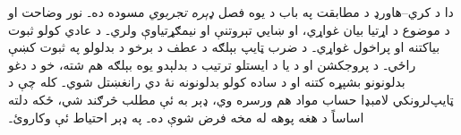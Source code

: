 \documentclass[../../../include/open-logic-chapter]{subfiles}
\begin{document}

\begin{editorial}
  دا د کري--هاورډ د مطابقت په باب د يوه فصل
  \emph{ډېره تجربوي} مسوده ده۔ نور وضاحت او د
  موضوع د اړتيا بيان غواړي، او ښايي تېروتنې او
  نيمګړتياوې ولري۔ د عادي کولو ثبوت بياکتنه او
  پراخول غواړي۔ د ضرب ټايپ بېلګه د عطف د برخو د بدلولو په ثبوت کښې راځي۔
  د پروجکشن او د يا د ايستلو ترتيب د بدلېدو يوه بېلګه هم شته،
  خو د دغو بدلونونو بشپړه کتنه او د ساده کولو
  بدلونونه نۀ دي رانغښتل شوي۔ کله چې د ټايپ‌لرونکي
  لامبډا حساب مواد هم ورسره وي، ډېر به ئې مطلب
  څرګند شي، ځکه دلته اساساً د هغه پوهه له مخه
  فرض شوې ده۔ په ډېر احتياط ئې وکاروئ۔
\end{editorial}


\OLEndChapterHook
\end{document}
